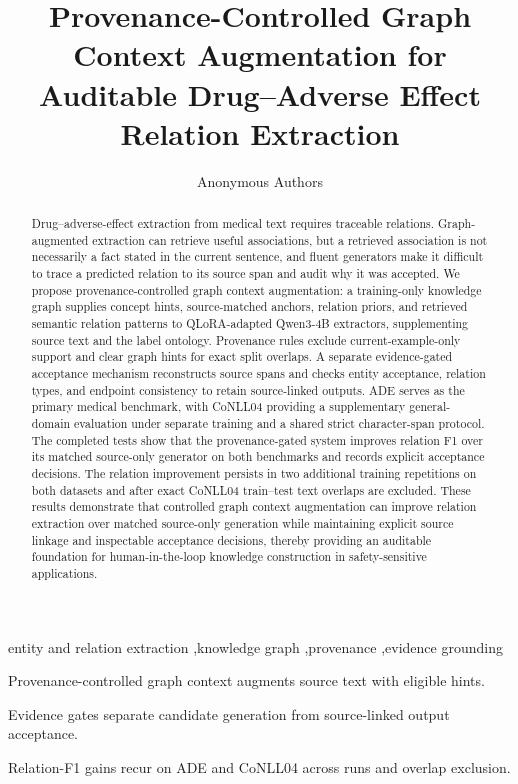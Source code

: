 \documentclass[a4paper,fleqn,numbers,doubleblind]{cas-dc}
\begin{document}
\let\WriteBookmarks\relax
\def\floatpagepagefraction{1}
\def\textpagefraction{.001}
\title[mode = title]{Provenance-Controlled Graph Context Augmentation for Auditable Drug--Adverse Effect Relation Extraction}
\author{Anonymous Authors}
\begin{abstract}
Drug--adverse-effect extraction from medical text requires traceable relations.
Graph-augmented extraction can retrieve useful associations, but a retrieved
association is not necessarily a fact stated in the current sentence, and
fluent generators make it difficult to trace a predicted relation to its source
span and audit why it was accepted. We propose provenance-controlled graph
context augmentation: a training-only knowledge graph supplies concept hints,
source-matched anchors, relation priors, and retrieved semantic relation
patterns to QLoRA-adapted Qwen3-4B extractors, supplementing source text and
the label ontology. Provenance rules exclude current-example-only support
and clear graph hints for exact split overlaps. A separate evidence-gated
acceptance mechanism reconstructs source spans and checks entity acceptance,
relation types, and endpoint consistency to retain source-linked outputs.
ADE serves as the
primary medical benchmark, with CoNLL04 providing a supplementary general-domain
evaluation under separate training and a shared strict character-span protocol.
The completed tests show that the
provenance-gated system improves relation F1 over its matched source-only
generator on both benchmarks and records explicit acceptance decisions. The
relation improvement persists in two additional training repetitions on both
datasets and after exact CoNLL04 train--test text overlaps are excluded. These
results demonstrate that controlled graph context augmentation can improve relation
extraction over matched source-only generation while maintaining explicit
source linkage and inspectable acceptance decisions, thereby providing an
auditable foundation for human-in-the-loop knowledge construction in
safety-sensitive applications.
\end{abstract}
\begin{keywords}
entity and relation extraction \sep knowledge graph \sep provenance
\sep evidence grounding
\end{keywords}
\begin{highlights}
\item Provenance-controlled graph context augments source text with eligible hints.
\item Evidence gates separate candidate generation from source-linked output acceptance.
\item Relation-F1 gains recur on ADE and CoNLL04 across runs and overlap exclusion.
\end{highlights}
\begingroup\hfuzz=124pt\maketitle\endgroup
\end{document}
